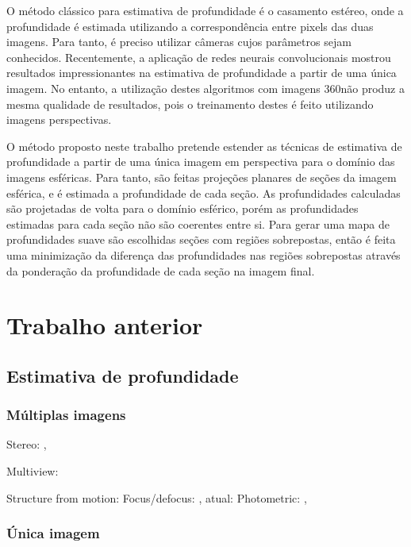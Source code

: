 \documentclass[cic,tc]{iiufrgs}
\begin{document}
O método clássico para estimativa de profundidade é o casamento estéreo, onde a profundidade é estimada utilizando a correspondência entre pixels das duas imagens. Para tanto, é preciso utilizar câmeras cujos parâmetros sejam conhecidos. Recentemente, a aplicação de redes neurais convolucionais mostrou resultados impressionantes na estimativa de profundidade a partir de uma única imagem. No entanto, a utilização destes algoritmos com imagens 360\degree não produz a mesma qualidade de resultados, pois o treinamento destes é feito utilizando imagens perspectivas. 

O método proposto neste trabalho pretende estender as técnicas de estimativa de profundidade a partir de uma única imagem em perspectiva para o domínio das imagens esféricas. Para tanto, são feitas projeções planares de seções da imagem esférica, e é estimada a profundidade de cada seção. As profundidades calculadas são projetadas de volta para o domínio esférico, porém as profundidades estimadas para cada seção não são coerentes entre si.
Para gerar uma mapa de profundidades suave são escolhidas seções com regiões sobrepostas, então é feita uma minimização da diferença das profundidades nas regiões sobrepostas através da ponderação da profundidade de cada seção na imagem final.


\chapter{Trabalho anterior}

\section{Estimativa de profundidade}

\subsection{Múltiplas imagens}
Stereo: \citet{stereoSurvey2001},  \citet{stereoSurvey2016}

Multiview: \citet{multiViewStereo2015}

Structure from motion: \citet{structMotion2016}
Focus/defocus: \citet{defocus1987}, atual: \citet{defocus2015}
Photometric: \citet{photometricStereo1989}, \citet{photometricStereo2012}

\subsection{Única imagem}
\end{document}
